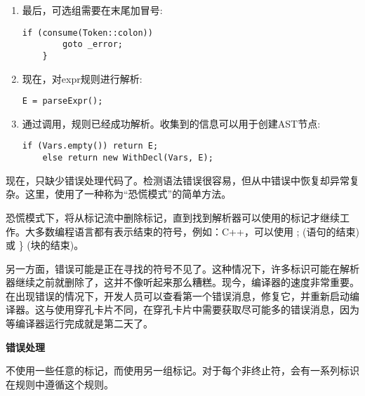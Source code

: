 \begin{enumerate}
\item 最后，可选组需要在末尾加冒号:
\begin{lstlisting}[caption={}]
	if (consume(Token::colon))
		goto _error;
	}
\end{lstlisting}

\item 现在，对expr规则进行解析:
\begin{lstlisting}[caption={}]
	E = parseExpr();
\end{lstlisting}

\item 通过调用，规则已经成功解析。收集到的信息可以用于创建AST节点:
\begin{lstlisting}[caption={}]
	if (Vars.empty()) return E;
	else return new WithDecl(Vars, E);
\end{lstlisting}
\end{enumerate}

现在，只缺少错误处理代码了。检测语法错误很容易，但从中错误中恢复却异常复杂。这里，使用了一种称为“恐慌模式”的简单方法。\par

恐慌模式下，将从标记流中删除标记，直到找到解析器可以使用的标记才继续工作。大多数编程语言都有表示结束的符号，例如：C++，可以使用 ; (语句的结束) 或 \} (块的结束)。\par

另一方面，错误可能是正在寻找的符号不见了。这种情况下，许多标识可能在解析器继续之前就删除了，这并不像听起来那么糟糕。现今，编译器的速度非常重要。在出现错误的情况下，开发人员可以查看第一个错误消息，修复它，并重新启动编译器。这与使用穿孔卡片不同，在穿孔卡片中需要获取尽可能多的错误消息，因为等编译器运行完成就是第二天了。\par

\hspace*{\fill} \par %
\textbf{错误处理}

不使用一些任意的标记，而使用另一组标记。对于每个非终止符，会有一系列标识在规则中遵循这个规则。\par

